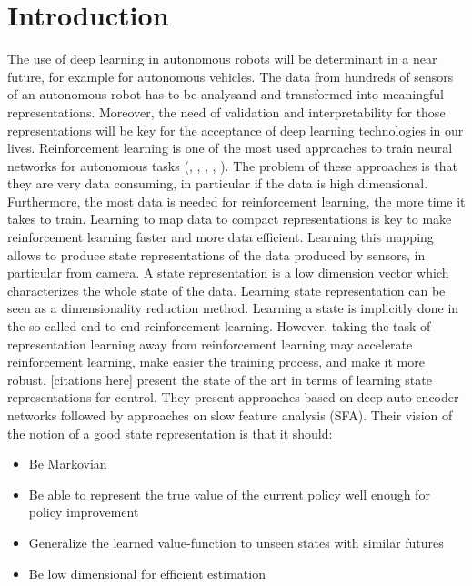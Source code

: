 \documentclass[a4paper]{article}
\begin{document}
\section{Introduction}
The use of deep learning in autonomous robots will be determinant in a near future, for example for autonomous vehicles. The data from hundreds of sensors of an autonomous robot has to  be analysand and transformed into meaningful representations. Moreover, the need of validation and interpretability for those representations will be key for the acceptance of deep learning technologies in our lives. 
Reinforcement learning is one of the most used approaches to train neural networks for autonomous tasks (\cite{Mnih15}, \cite{Lillicrap15}, \cite{Schulman15}, \cite{Wu17}, \cite{Schulman17}). The problem of these approaches is that they are very data consuming, in particular if the data is high dimensional. Furthermore, the most data is needed for reinforcement learning, the more time it takes to train. Learning to map data to compact representations is key to make reinforcement learning faster and more data efficient. Learning this mapping allows to produce state representations of the data produced by sensors, in particular from camera. A state representation is a low dimension vector which characterizes the whole state of the data. Learning state representation can be seen as a dimensionality reduction method. Learning a state is implicitly done in the so-called end-to-end reinforcement learning. %
However, taking the task of representation learning away from reinforcement learning may accelerate reinforcement learning, make easier the training process, and make it more robust. [citations here]
\cite{Bohmer15} present the state of the art in terms of learning state representations for control. They present approaches based on deep auto-encoder networks followed by approaches on slow feature analysis (SFA). %
Their vision of the notion of a good state representation is that it should: %
\begin{itemize}
\item Be Markovian
\item Be able  to represent  the  true  value of  the current policy well enough for policy improvement
\item Generalize the learned value-function to unseen states with similar futures
\item Be low dimensional for efficient estimation
\end{itemize}
\end{document}
